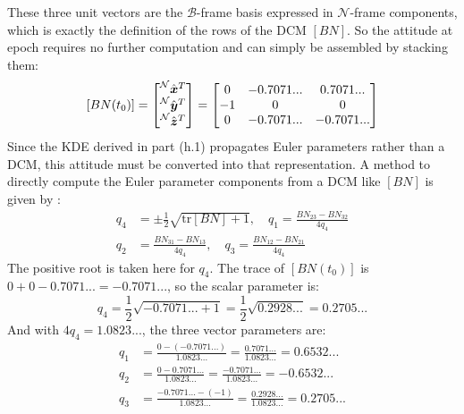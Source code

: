 \documentclass[titlepage]{article}
\begin{document}
These three unit vectors are the $\mathcal{B}$-frame basis expressed in $\mathcal{N}$-frame components, which is exactly the definition of the rows of the DCM $[BN]$. So the attitude at epoch requires no further computation and can simply be assembled by stacking them:
\begin{equation}
	\left[BN(t_0)\right]=
	\begin{bmatrix}
		\prescript{\mathcal{N}}{}{\hat{\boldsymbol{x}}}^T \\
		\prescript{\mathcal{N}}{}{\hat{\boldsymbol{y}}}^T \\
		\prescript{\mathcal{N}}{}{\hat{\boldsymbol{z}}}^T \\
	\end{bmatrix}=
	\begin{bmatrix}
		0 & -0.7071... & 0.7071... \\
		-1 & 0 & 0 \\
		0 & -0.7071... & -0.7071... \\
	\end{bmatrix}
\end{equation}
Since the KDE derived in part (h.1) propagates Euler parameters rather than a DCM, this attitude must be converted into that representation. A method to directly compute the Euler parameter components from a DCM like $[BN] $ is given by \cite{schaub_analytical_2018}:
\begin{equation}
	\begin{split}
		q_4&=\pm\frac{1}{2}\sqrt{\text{tr}\left[BN\right]+1},\quad
		q_1=\frac{BN_{23}-BN_{32}}{4q_4}\\
		q_2&=\frac{BN_{31}-BN_{13}}{4q_4},\quad
		q_3=\frac{BN_{12}-BN_{21}}{4q_4}
	\end{split}
\end{equation}
The positive root is taken here for $q_4$. The trace of $[BN(t_0)]$ is $0+0-0.7071...=-0.7071...$, so the scalar parameter is:
\begin{equation}
	q_4=\frac{1}{2}\sqrt{-0.7071...+1}=\frac{1}{2}\sqrt{0.2928...}=0.2705...
\end{equation}
And with $4q_4=1.0823...$, the three vector parameters are:
\begin{equation}
	\begin{split}
		q_1&=\frac{0-\left(-0.7071...\right)}{1.0823...}=\frac{0.7071...}{1.0823...}=0.6532... \\
		q_2&=\frac{0-0.7071...}{1.0823...}=\frac{-0.7071...}{1.0823...}=-0.6532... \\
		q_3&=\frac{-0.7071...-\left(-1\right)}{1.0823...}=\frac{0.2928...}{1.0823...}=0.2705... \\
	\end{split}
\end{equation}
\end{document}
